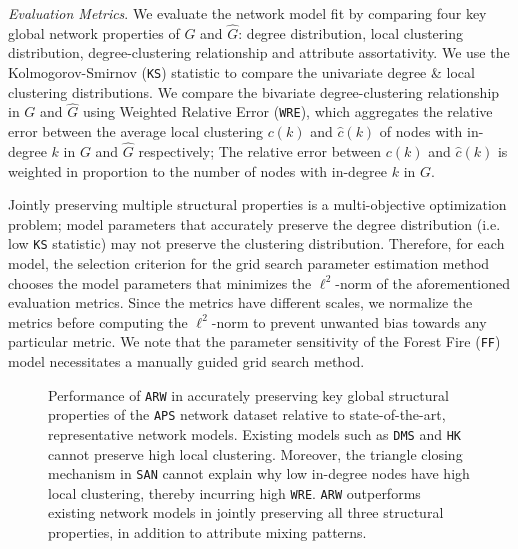 \textit{Evaluation Metrics}.
We evaluate the network model fit by comparing four key global network properties of ${G}$ and $\hat{G}$:
degree distribution, local clustering distribution, degree-clustering relationship
and attribute assortativity. We use the Kolmogorov-Smirnov (\texttt{KS}) statistic to compare the univariate degree
\& local clustering distributions. We compare the bivariate degree-clustering relationship in $G$ and $\hat{G}$ using
Weighted Relative Error (\texttt{WRE}), which aggregates the relative error
between the average local clustering $c(k)$ and $\hat{c}(k)$ of nodes with in-degree $k$
in $G$ and $\hat{G}$ respectively; The relative error between $c(k)$ and $\hat{c}(k)$
is weighted in proportion to the number of nodes with in-degree $k$ in $G$.

Jointly preserving multiple structural properties is a multi-objective optimization
problem; model parameters that accurately preserve the degree distribution
(i.e. low \texttt{KS} statistic) may not preserve the clustering distribution.
Therefore, for each model, the selection criterion for the grid search parameter estimation method
chooses the model parameters that minimizes the $\ell^2$-norm of the aforementioned evaluation metrics.
Since the metrics have different scales, we normalize the metrics before computing the $\ell^2$-norm
to prevent unwanted bias towards any particular metric.
We note that the parameter sensitivity of the Forest Fire (\texttt{FF}) model necessitates
a manually guided grid search method.

\begin{figure*}[b]
	\centering
	\caption{
		Performance of \texttt{ARW} in accurately preserving key global structural properties
		of the \texttt{APS} network dataset relative to state-of-the-art, representative
		network models. Existing models such as \texttt{DMS} and \texttt{HK} cannot preserve high
		local clustering.
		Moreover, the triangle closing mechanism in \texttt{SAN} cannot explain why low in-degree nodes have high local clustering, thereby incurring high
		\texttt{WRE}. \texttt{ARW} outperforms existing network models
		in jointly preserving all three structural properties, in addition to attribute mixing patterns.}
	\label{fig:aps_fits}
\end{figure*}

